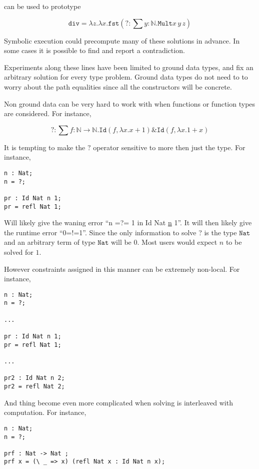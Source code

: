 can be used to prototype

\[
\mathtt{div}=\lambda z.\lambda x.\mathtt{fst}\left(?:\sum y:\mathbb{N}.\mathtt{Mult}x\,y\,z\right)
\]

Symbolic execution could precompute many of these solutions in advance.
In some cases it is possible to find and report a contradiction. 

Experiments along these lines have been limited to ground data types, and fix an arbitrary solution for every type problem.
Ground data types do not need to to worry about the path equalities since all the constructors will be concrete.

Non ground data can be very hard to work with when functions or function types are considered. For instance,

\[
?:\sum f:\mathbb{N}\rightarrow\mathbb{N}.\mathtt{Id}\left(f,\lambda x.x+1\right)\&\mathtt{Id}\left(f,\lambda x.1+x\right)
\]

It is tempting to make the $?$ operator sensitive to more then just the type.
For instance,

\begin{lstlisting}
n : Nat;
n = ?;

pr : Id Nat n 1;
pr = refl Nat 1;
\end{lstlisting}

Will likely give the waning error ``n =?= 1 in Id Nat \uline{n} 1''.
It will then likely give the runtime error ``0=!=1''.
Since the only information to solve ? is the type $\mathtt{Nat}$ and an arbitrary term of type $\mathtt{Nat}$ will be 0.
Most users would expect $n$ to be solved for $1$.

However constraints assigned in this manner can be extremely non-local.
For instance,

\begin{lstlisting}
n : Nat;
n = ?;

...

pr : Id Nat n 1;
pr = refl Nat 1;

...

pr2 : Id Nat n 2;
pr2 = refl Nat 2;
\end{lstlisting}

And thing become even more complicated when solving is interleaved with computation.
For instance,

\begin{lstlisting}
n : Nat;
n = ?;

prf : Nat -> Nat ;
prf x = (\ _ => x) (refl Nat x : Id Nat n x);
\end{lstlisting}


